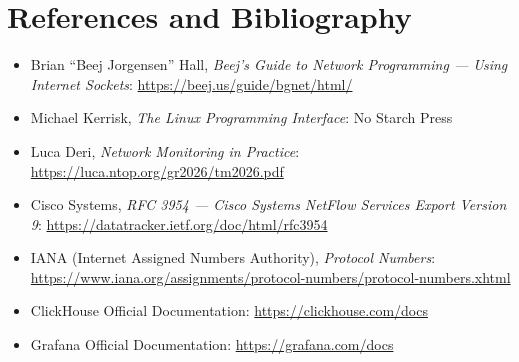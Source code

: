 \documentclass[11pt,a4paper]{article}
\begin{document}
\section{References and Bibliography}
\begin{itemize}
    \item Brian ``Beej Jorgensen'' Hall, \emph{Beej's Guide to Network Programming --- Using Internet Sockets}: \url{https://beej.us/guide/bgnet/html/}
    \item Michael Kerrisk, \emph{The Linux Programming Interface}: No Starch Press
    \item Luca Deri, \emph{Network Monitoring in Practice}: \url{https://luca.ntop.org/gr2026/tm2026.pdf}
    \item Cisco Systems, \emph{RFC 3954 --- Cisco Systems NetFlow Services Export Version 9}: \url{https://datatracker.ietf.org/doc/html/rfc3954}
    \item IANA (Internet Assigned Numbers Authority), \emph{Protocol Numbers}: \url{https://www.iana.org/assignments/protocol-numbers/protocol-numbers.xhtml}
    \item ClickHouse Official Documentation: \url{https://clickhouse.com/docs}
    \item Grafana Official Documentation: \url{https://grafana.com/docs}
\end{itemize}
\end{document}
